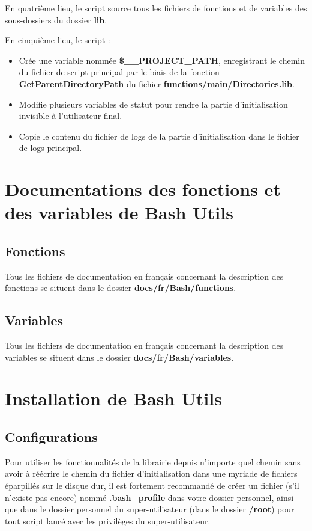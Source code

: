 \documentclass[a4paper,10pt]{article}
\begin{document}
En quatrième lieu, le script source tous les fichiers de fonctions et de variables des sous-dossiers du dossier \color{lime}\textbf{lib}\color{white}.

En cinquième lieu, le script :
\begin{itemize}
    \item Crée une variable nommée \color{orange}\textbf{\$\_\_PROJECT\_PATH}\color{white}, enregistrant le chemin du fichier de script principal par le biais de la fonction \color{mauve}\textbf{GetParentDirectoryPath} \color{white} du fichier \color{lime}\textbf{functions/main/Directories.lib}\color{white}.
    
    \item Modifie plusieurs variables de statut pour rendre la partie d'initialisation invisible à l'utilisateur final.
    
    \item Copie le contenu du fichier de logs de la partie d'initialisation dans le fichier de logs principal.
\end{itemize}


\color{red}
\section{Documentations des fonctions et des variables de Bash Utils}\color{white}

\color{green}
\subsection{Fonctions}\color{white}
Tous les fichiers de documentation en français concernant la description des fonctions se situent dans le dossier \color{lime}\textbf{docs/fr/Bash/functions}\color{white}.

\color{green}
\subsection{Variables}\color{white}
Tous les fichiers de documentation en français concernant la description des variables se situent dans le dossier \color{lime}\textbf{docs/fr/Bash/variables}\color{white}.

\color{red}
\section{Installation de Bash Utils}\color{white}

\color{green}
\subsection{Configurations}\color{white}
Pour utiliser les fonctionnalités de la librairie depuis n'importe quel chemin sans avoir à réécrire le chemin du fichier d'initialisation dans une myriade de fichiers éparpillés sur le disque dur, il est fortement recommandé de créer un fichier (s'il n'existe pas encore) nommé \color{lime}\textbf{.bash\_profile}\color{white} dans votre dossier personnel, ainsi que dans le dossier personnel du super-utilisateur (dans le dossier \color{lime}\textbf{/root}\color{white}) pour tout script lancé avec les privilèges du super-utilisateur.
\end{document}
